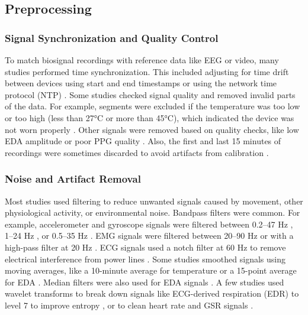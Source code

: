 \subsection{Preprocessing}

\subsubsection{Signal Synchronization and Quality Control}
To match biosignal recordings with reference data like EEG or video, many studies performed time synchronization. This included adjusting for time drift between devices using start and end timestamps or using the network time protocol (NTP) \cite{Onorati2017-bn,Vakilna2024-hk,Tang2021-td}. Some studies checked signal quality and removed invalid parts of the data. For example, segments were excluded if the temperature was too low or too high (less than 27°C or more than 45°C), which indicated the device was not worn properly \cite{Yu2023-ss,Tang2021-td}. Other signals were removed based on quality checks, like low EDA amplitude or poor PPG quality \cite{Ge2023-ab,Arends2018-ew}. Also, the first and last 15 minutes of recordings were sometimes discarded to avoid artifacts from calibration \cite{Yu2023-ss}.

\subsubsection{Noise and Artifact Removal}
Most studies used filtering to reduce unwanted signals caused by movement, other physiological activity, or environmental noise. Bandpass filters were common. For example, accelerometer and gyroscope signals were filtered between 0.2–47 Hz \cite{Milosevic2016-ee,De_Cooman2018-pq}, 1–24 Hz \cite{Wu2024-yl}, or 0.5–35 Hz \cite{Gheryani2017-yg}. EMG signals were filtered between 20–90 Hz \cite{Wu2024-yl} or with a high-pass filter at 20 Hz \cite{Milosevic2016-ee,De_Cooman2018-pq}. ECG signals used a notch filter at 60 Hz to remove electrical interference from power lines \cite{Hamlin2021-sd}. Some studies smoothed signals using moving averages, like a 10-minute average for temperature \cite{Yu2023-ss} or a 15-point average for EDA \cite{Wang2022-lt}. Median filters were also used for EDA signals \cite{Wang2025-ql}. A few studies used wavelet transforms to break down signals like ECG-derived respiration (EDR) to level 7 to improve entropy \cite{Forooghifar2022-dm}, or to clean heart rate and GSR signals \cite{Jiang2022-zu}.

